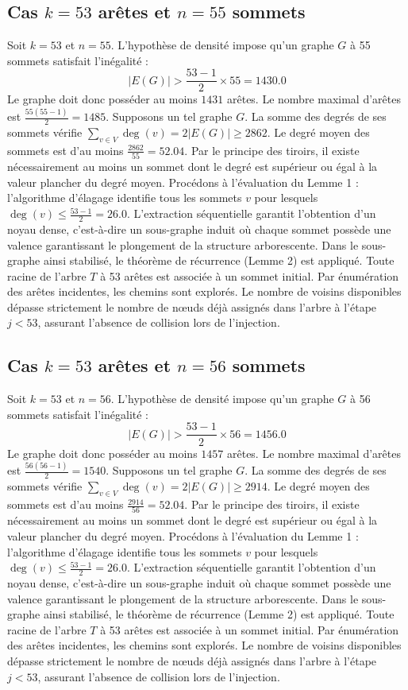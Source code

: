 \documentclass[12pt,a4paper]{article}
\begin{document}
\subsection{Cas $k = 53$ arêtes et $n = 55$ sommets}
Soit $k = 53$ et $n = 55$. L'hypothèse de densité impose qu'un graphe $G$ à 55 sommets satisfait l'inégalité :
$$ |E(G)| > \frac{53-1}{2} \times 55 = 1430.0 $$
Le graphe doit donc posséder au moins $1431$ arêtes. Le nombre maximal d'arêtes est $\frac{55(55-1)}{2} = 1485$.
Supposons un tel graphe $G$. La somme des degrés de ses sommets vérifie $\sum_{v \in V} \deg(v) = 2|E(G)| \geq 2862$.
Le degré moyen des sommets est d'au moins $\frac{2862}{55} = 52.04$.
Par le principe des tiroirs, il existe nécessairement au moins un sommet dont le degré est supérieur ou égal à la valeur plancher du degré moyen.
Procédons à l'évaluation du Lemme 1 : l'algorithme d'élagage identifie tous les sommets $v$ pour lesquels $\deg(v) \leq \frac{53-1}{2} = 26.0$.
L'extraction séquentielle garantit l'obtention d'un noyau dense, c'est-à-dire un sous-graphe induit où chaque sommet possède une valence garantissant le plongement de la structure arborescente.
Dans le sous-graphe ainsi stabilisé, le théorème de récurrence (Lemme 2) est appliqué. Toute racine de l'arbre $T$ à 53 arêtes est associée à un sommet initial. Par énumération des arêtes incidentes, les chemins sont explorés. Le nombre de voisins disponibles dépasse strictement le nombre de nœuds déjà assignés dans l'arbre à l'étape $j < 53$, assurant l'absence de collision lors de l'injection.

\subsection{Cas $k = 53$ arêtes et $n = 56$ sommets}
Soit $k = 53$ et $n = 56$. L'hypothèse de densité impose qu'un graphe $G$ à 56 sommets satisfait l'inégalité :
$$ |E(G)| > \frac{53-1}{2} \times 56 = 1456.0 $$
Le graphe doit donc posséder au moins $1457$ arêtes. Le nombre maximal d'arêtes est $\frac{56(56-1)}{2} = 1540$.
Supposons un tel graphe $G$. La somme des degrés de ses sommets vérifie $\sum_{v \in V} \deg(v) = 2|E(G)| \geq 2914$.
Le degré moyen des sommets est d'au moins $\frac{2914}{56} = 52.04$.
Par le principe des tiroirs, il existe nécessairement au moins un sommet dont le degré est supérieur ou égal à la valeur plancher du degré moyen.
Procédons à l'évaluation du Lemme 1 : l'algorithme d'élagage identifie tous les sommets $v$ pour lesquels $\deg(v) \leq \frac{53-1}{2} = 26.0$.
L'extraction séquentielle garantit l'obtention d'un noyau dense, c'est-à-dire un sous-graphe induit où chaque sommet possède une valence garantissant le plongement de la structure arborescente.
Dans le sous-graphe ainsi stabilisé, le théorème de récurrence (Lemme 2) est appliqué. Toute racine de l'arbre $T$ à 53 arêtes est associée à un sommet initial. Par énumération des arêtes incidentes, les chemins sont explorés. Le nombre de voisins disponibles dépasse strictement le nombre de nœuds déjà assignés dans l'arbre à l'étape $j < 53$, assurant l'absence de collision lors de l'injection.
\end{document}
